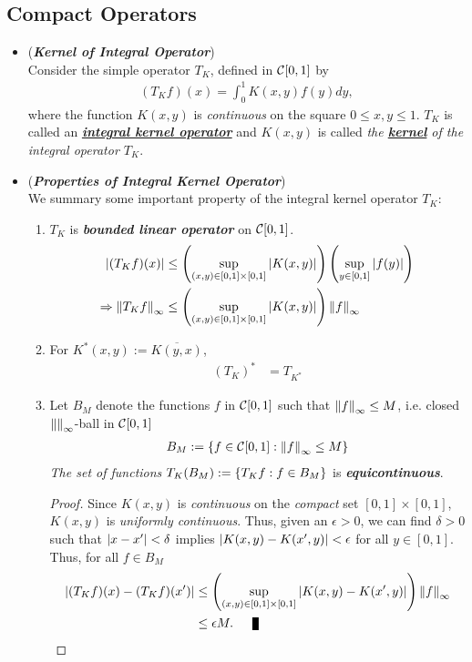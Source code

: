 \documentclass[11pt]{article}
\begin{document}
\subsection{Compact Operators}
\begin{itemize}
\item \begin{definition} (\emph{\textbf{Kernel of Integral Operator}})\\
Consider the simple operator $T_{K}$, defined in ${\mathcal C}[0, 1]$ by 
\begin{align*}
(T_{K}f)(x) = \int_{0}^{1} K(x, y)f(y) dy,
\end{align*} where the function $K(x, y)$ is \emph{continuous} on the square $0\le x, y \le 1$.  $T_{K}$ is called an \underline{\emph{\textbf{integral kernel operator}}} and $K(x, y)$ is called \emph{the \underline{\textbf{kernel}} of the integral operator $T_K$}. 
\end{definition}

\item \begin{remark} (\emph{\textbf{Properties of Integral Kernel Operator}})\\
We summary some important property of the integral kernel operator $T_K$:
\begin{enumerate}
\item $T_K$ is \emph{\textbf{bounded linear operator}} on ${\mathcal C}[0,1]$.
\begin{align*}
\left\lvert (T_{K}f)(x) \right\rvert &\le \left(\sup_{(x,y) \in [0,1]\times [0,1]}\left\lvert K(x,y) \right\rvert\right)\left(\sup_{y\in [0,1]}\left\lvert f(y) \right\rvert\right)\\
\Rightarrow \left\|T_K f\right\|_{\infty} & \le \left(\sup_{(x,y) \in [0,1]\times [0,1]}\left\lvert K(x,y) \right\rvert\right)\left\|f\right\|_{\infty}
\end{align*}

\item For $K^{*}(x, y) := \overline{K(y, x)}$, 
\begin{align*}
(T_{K})^{*} &= T_{K^{*}}
\end{align*}

\item Let $B_M$ denote the functions $f$ in ${\mathcal C}[0, 1]$ such that $\left\|f\right\|_{\infty} \le M$, i.e. closed $\left\|\right\|_{\infty}$-ball in ${\mathcal C}[0, 1]$
\begin{align*}
B_M := \left\{f \in {\mathcal C}[0, 1]: \left\|f\right\|_{\infty} \le M\right\}
\end{align*} \emph{The set of functions} $T_K(B_M) := \left\{T_{K}f: f\in B_M\right\}$ is \emph{\textbf{equicontinuous}}.
\begin{proof}
Since $K(x, y)$ is \emph{continuous} on the \textit{compact} set $[0,1]\times [0,1]$, $K(x, y)$ is \emph{uniformly continuous}. Thus, given an $\epsilon > 0$, we can find  $\delta > 0$ such that $\left\lvert x - x' \right\rvert < \delta$ implies $\left\lvert K(x, y) - K(x', y)  \right\rvert < \epsilon$ for all $y \in  [0, 1]$. 
Thus, for all $f \in B_M$
\begin{align*}
\abs{(T_{K}f)(x) - (T_{K}f)(x')} & \le \paren{\sup_{(x,y) \in [0,1]\times [0,1]}\abs{K(x,y) - K(x', y)}}\norm{f}{\infty} \\
& \le \epsilon M. \qed
\end{align*} 
\end{proof}


\end{enumerate}
\end{remark}
\end{itemize}
\end{document}
